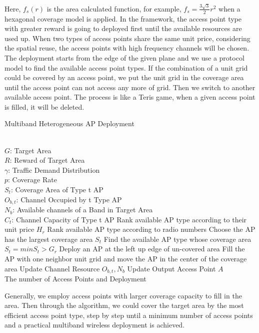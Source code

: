 Here, $f_s(r)$ is the area calculated function, for example, $f_s = \frac{3\sqrt{3}}{2}r^2$ when a 
hexagonal coverage model is applied. In the framework, the access point type with greater reward 
is going to deployed first until the available resources are used up. When two types of access points
share the same unit price, considering the spatial reuse, the access points with high frequency channels
will be chosen. The deployment starts from the edge of the given plane and we use a protocol model
to find the available access point types. If the combination of a unit 
grid could be covered by an access point, we put the unit grid in the coverage area until the access
point can not access any more of grid. Then we switch to another available access point. The process is like
a Teris game, when a given access point is filled, it will be deleted.
\begin{algorithm}
\caption{Multiband Heterogeneous AP Deployment}
\label{alg:gls}
\begin{algorithmic}[1]
\REQUIRE  ~~\\
$G$: Target Area \\
$R$: Reward of Target Area \\
$\gamma$: Traffic Demand Distribution\\
$p$: Coverage Rate\\
$S_t$: Coverage Area of Type t AP \\
$O_{b,t}$: Channel Occupied by t Type AP\\
$N_b$: Available channels of a Band in Target Area\\
$C_t$: Channel Capacity of Type t AP
\STATE Rank available AP type according to their unit price $H_r$
\STATE Rank available AP type according to radio numbers
\STATE Choose the AP has the largest coverage area $S_t$
\ELSE 
\STATE Find the available AP type whose coverage area $S_t=min{S_t>G_r}$
\ENDIF
\STATE Deploy an AP at the left up edge of un-covered area
\STATE Fill the AP with one neighbor unit grid and move the AP in the center of the coverage area
\STATE Update Channel Resource $O_{b,t}, N_b$
\STATE Update Output Access Point $A$
\ENDWHILE
\ENSURE ~~\\
The number of Access Points and Deployment\\
\end{algorithmic}
\end{algorithm}

Generally, we employ access points with larger coverage capacity to fill in the area. Then 
through the algorithm, we could cover the target area by the most efficient access point type,
step by step until a  minimum number of access points and a practical multiband wireless deployment is achieved.
